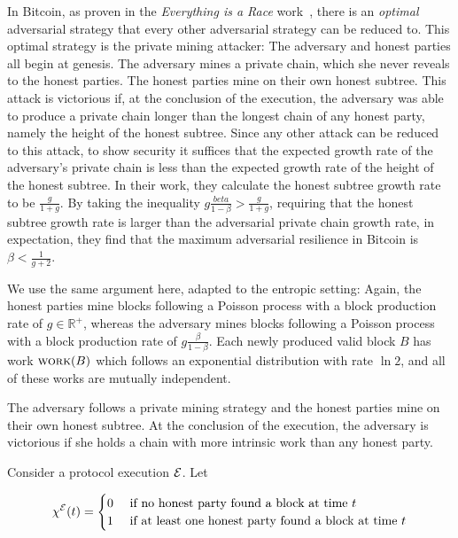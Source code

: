 In Bitcoin,
as proven in the \emph{Everything is a Race} work~\cite[Theorem 5.1]{eiar}, there is
an \emph{optimal} adversarial strategy that every other adversarial strategy can be reduced to.
This optimal strategy is the private mining attacker: The adversary and honest parties
all begin at genesis. The adversary mines a private chain, which she never reveals to the honest
parties. The honest parties mine on their own honest subtree. This attack is victorious if,
at the conclusion of the execution, the adversary was able to produce a private chain longer
than the longest chain of any honest party, namely the height of the honest subtree. Since
any other attack can be reduced to this attack, to show security it suffices that the expected
growth rate of the adversary's private chain is less than the expected growth rate of the
height of the honest subtree. In their work, they calculate the honest subtree growth rate to be
$\frac{g}{1 + g}$. By taking the inequality $g \frac{beta}{1 - \beta} > \frac{g}{1 + g}$,
requiring that the honest subtree growth rate is larger than the adversarial private chain
growth rate, in expectation, they find that the maximum adversarial resilience in Bitcoin is
$\beta < \frac{1}{g + 2}$.

We use the same argument here, adapted to the entropic setting: Again, the honest parties mine
blocks following a Poisson process with a block production rate of $g \in \mathbb{R}^+$, whereas
the adversary mines blocks following a Poisson process with a block production rate of
$g \frac{\beta}{1 - \beta}$. Each newly produced valid block $B$ has work $\textsc{work}(B)$ which follows
an exponential distribution with rate $\ln2$, and all of these works are mutually independent.


The adversary follows a private
mining strategy and the honest parties mine on their own honest subtree. At the conclusion of the
execution, the adversary is victorious if she holds a chain with more intrinsic work than any honest
party.

Consider a protocol execution $\mathcal{E}$. Let 

\[
  \chi^{\mathcal{E}}(t) = \begin{cases}
    0 & \text{ if no honest party found a block at time } t\\
    1 & \text{ if at least one honest party found a block at time } t
  \end{cases}
\]

